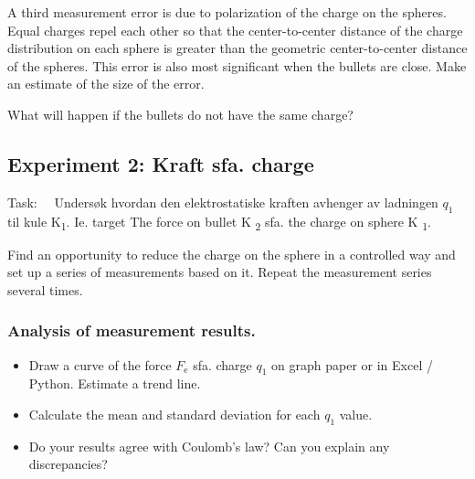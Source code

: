 \documentclass[../Elmag-labhefte-2020.tex]{subfiles}
\begin{document}
\begin{itemize}
A third measurement error is due to polarization of the charge on the spheres. Equal charges repel each other so that the center-to-center distance of the charge distribution on each sphere is greater than the geometric center-to-center distance of the spheres. This error is also most significant when the bullets are close. Make an estimate of the size of the error.

What will happen if the bullets do not have the same charge?



\subsection{Experiment 2: Kraft sfa. charge}

Task: \ \
{\itsf Undersøk hvordan den elektrostatiske kraften avhenger av ladningen $q_1$ til kule K\textsubscript{1}. Ie. target The force on bullet K \textsubscript{2} sfa. the charge on sphere K \textsubscript{1}.}

Find an opportunity to reduce the charge on the sphere in a controlled way and set up a series of measurements based on it. Repeat the measurement series several times.

\subsubsection{Analysis of measurement results.}

\vspace{-4mm}
\begin{itemize}
    \item Draw a curve of the force $F_\text{e}$ sfa. charge $q_1$ on graph paper or in Excel / Python. Estimate a trend line.
    \item Calculate the mean and standard deviation for each $q_1$ value.
    \item Do your results agree with Coulomb's law? Can you explain any discrepancies?
\end{itemize}



\end{itemize}
\end{document}
